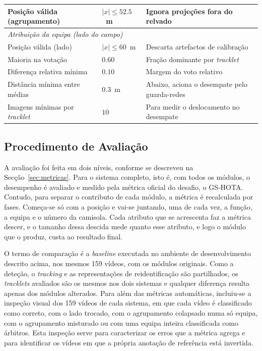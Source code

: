 \begin{table}[htbp]
\begin{tabular}{|l|l|l|}
        \hline
        Posição válida (agrupamento) & $|x| \le 52.5$~m & Ignora projeções fora do relvado \\
        \hline
        \multicolumn{3}{|l|}{\emph{Atribuição da equipa (lado do campo)}} \\
        \hline
        Posição válida (lado)        & $|x| \le 60$~m   & Descarta artefactos de calibração \\
        \hline
        Maioria na votação           & $0.60$          & Fração dominante por \emph{tracklet} \\
        \hline
        Diferença relativa mínima    & $0.10$          & Margem do voto relativo \\
        \hline
        Distância mínima entre médias & $0.3$~m        & Abaixo, aciona o desempate pelo guarda-redes \\
        \hline
        Imagens mínimas por \emph{tracklet} & $10$    & Para medir o deslocamento no desempate \\
        \hline
    \end{tabular}
\end{table}


\FloatBarrier
\subsection{Procedimento de Avaliação}\label{sec:protocolo}

A avaliação foi feita em dois níveis, conforme se descreveu na Secção~\ref{sec:metricas}. Para o sistema completo, isto é, com todos os módulos, o desempenho é avaliado e medido pela métrica oficial do desafio, o GS-HOTA. Contudo, para separar o contributo de cada módulo, a métrica é recalculada por fases. Começa-se só com a posição e vai-se juntando, uma de cada vez, a função, a equipa e o número da camisola. Cada atributo que se acrescenta faz a métrica descer, e o tamanho dessa descida mede quanto esse atributo, e logo o módulo que o produz, custa ao resultado final.

O termo de comparação é a \emph{baseline} executada no ambiente de desenvolvimento descrito acima, nos mesmos 159 vídeos, com os módulos originais. Como a deteção, o \emph{tracking} e as representações de reidentificação são partilhados, os \emph{tracklets} avaliados são os mesmos nos dois sistemas e qualquer diferença resulta apenas dos módulos alterados. Para além das métricas automáticas, incluiu-se a inspeção visual dos 159 vídeos de cada sistema, em que cada vídeo é classificado como correto, com o lado trocado, com o agrupamento colapsado numa só equipa, com o agrupamento misturado ou com uma equipa inteira classificada como árbitros. Esta inspeção serve para caracterizar os erros que a métrica agrega e para identificar os vídeos em que a própria anotação de referência está invertida.

